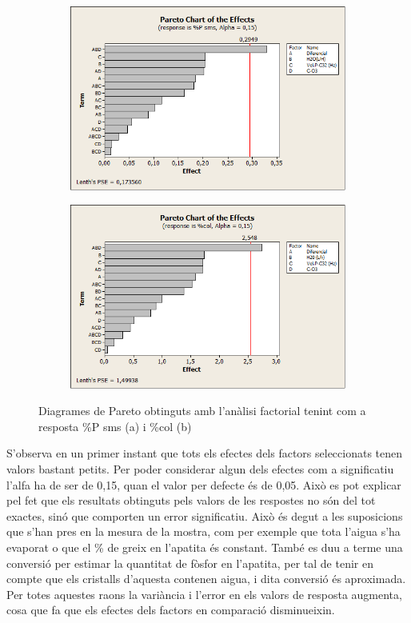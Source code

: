 \documentclass[a4paper]{article}
\begin{document}
\begin{figure}[H]
	\begin{subfigure}{.5\textwidth}
		\centering
		\includegraphics[width=.9\linewidth]{images/Pareto15P}
		\caption{}
		\label{fig:Pareto15P}
	\end{subfigure}%
	\begin{subfigure}{.5\textwidth}
		\centering
		\includegraphics[width=.9\linewidth]{images/Pareto15col}
		\caption{}
		\label{fig:Pareto15C}
	\end{subfigure}
	\caption{Diagrames de Pareto obtinguts amb l’anàlisi factorial tenint com a resposta \%P sms (a) i \%col (b)}
	\label{fig:Pareto15}
\end{figure}

S’observa en un primer instant que tots els efectes dels factors seleccionats tenen valors bastant petits. Per poder considerar algun dels efectes com a significatiu l’alfa ha de ser de 0,15, quan el valor per defecte és de 0,05. Això es pot explicar pel fet que els resultats obtinguts pels valors de les respostes no són del tot exactes, sinó que comporten un error significatiu. Això és degut a les suposicions que s’han pres en la mesura de la mostra, com per exemple que tota l’aigua s’ha evaporat o que el \% de greix en l’apatita és constant. També es duu a terme una conversió per estimar la quantitat de fòsfor en l’apatita, per tal de tenir en compte que els cristalls d’aquesta contenen aigua, i dita conversió és aproximada. Per totes aquestes raons la variància i l’error en els valors de resposta augmenta, cosa que fa que els efectes dels factors en comparació disminueixin.
\end{document}
